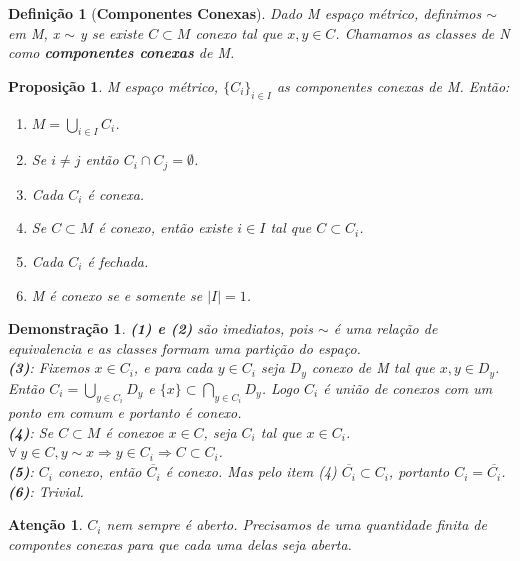 \documentclass{article}
\newtheorem*{definition}{Definição}
\newtheorem*{atencao}{Atenção}
\newtheorem*{proposicao}{Proposição}
\newtheorem*{prova}{Demonstração}
\begin{document}
\begin{definition}[\textbf{Componentes Conexas}]
    Dado M espaço métrico, definimos $\sim$ em M, x $\sim$ y se existe 
    $C \subset M$ conexo tal que $x, y \in C$. 
    Chamamos as classes de N como \textbf{componentes conexas} de M.
\end{definition}

\begin{proposicao}
    M espaço métrico, $\{C_i\}_{i\in I}$ as componentes conexas de M. Então:
    \begin{enumerate}
        \item $M = \bigcup_{i \in I} C_i$.
        \item Se $i \neq j$ então $C_i \cap C_j = \emptyset$.
        \item Cada $C_i$ é conexa.
        \item Se $C \subset M$ é conexo, então existe $i \in I$ tal que $C \subset C_i$.
        \item Cada $C_i$ é fechada.
        \item M é conexo se e somente se $|I| = 1$.
    \end{enumerate}
\end{proposicao}

\begin{prova}
    \textbf{(1) e (2)} são imediatos, pois $\sim$ é uma relação de equivalencia e
    as classes formam uma partição do espaço.\\
    \textbf{(3)}: Fixemos $x \in C_i$, e para cada $y \in C_i$ seja $D_y$ conexo de M
    tal que $x, y \in D_y$.
    Então $C_i = \bigcup_{y \in C_i} D_y$ e $\{x\} \subset \bigcap_{y \in C_i} D_y$.
    Logo $C_i$ é união de conexos com um ponto em comum e portanto é conexo.\\
    \textbf{(4)}: Se $C \subset M$ é conexoe $x \in C$, seja $C_i$ tal que $x \in C_i$.
    $\forall \: y \in  C, y \sim x \Rightarrow y \in C_i \Rightarrow C \subset C_i$. \\
    \textbf{(5)}: $C_i$ conexo, então $\overline{C_i}$ é conexo.
    Mas pelo item (4) $\overline{C_i} \subset C_i$, portanto $C_i = \overline{C_i}$.\\
    \textbf{(6)}: Trivial.
\end{prova}

\begin{atencao}
    $C_i$ nem sempre é aberto.
    Precisamos de uma quantidade finita de compontes conexas para que cada uma delas seja aberta.
\end{atencao}
\end{document}
